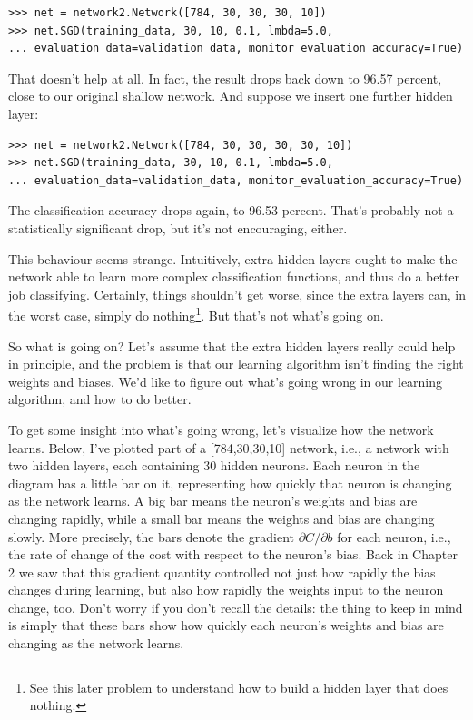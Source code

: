 \documentclass[a4paper,twoside,10pt]{book}
\begin{document}
\begin{lstlisting}
>>> net = network2.Network([784, 30, 30, 30, 10])
>>> net.SGD(training_data, 30, 10, 0.1, lmbda=5.0, 
... evaluation_data=validation_data, monitor_evaluation_accuracy=True)
\end{lstlisting}
That doesn't help at all. In fact, the result drops back down to 96.57 percent, close to our original shallow network. And suppose we insert one further hidden layer:

\begin{lstlisting}
>>> net = network2.Network([784, 30, 30, 30, 30, 10])
>>> net.SGD(training_data, 30, 10, 0.1, lmbda=5.0, 
... evaluation_data=validation_data, monitor_evaluation_accuracy=True)
\end{lstlisting}
The classification accuracy drops again, to 96.53 percent. That's probably not a statistically significant drop, but it's not encouraging, either.

This behaviour seems strange. Intuitively, extra hidden layers ought to make the network able to learn more complex classification functions, and thus do a better job classifying. Certainly, things shouldn't get worse, since the extra layers can, in the worst case, simply do nothing\footnote{See this later problem to understand how to build a hidden layer that does nothing.}. But that's not what's going on.

So what is going on? Let's assume that the extra hidden layers really could help in principle, and the problem is that our learning algorithm isn't finding the right weights and biases. We'd like to figure out what's going wrong in our learning algorithm, and how to do better.

To get some insight into what's going wrong, let's visualize how the network learns. Below, I've plotted part of a [784,30,30,10] network, i.e., a network with two hidden layers, each containing 30 hidden neurons. Each neuron in the diagram has a little bar on it, representing how quickly that neuron is changing as the network learns. A big bar means the neuron's weights and bias are changing rapidly, while a small bar means the weights and bias are changing slowly. More precisely, the bars denote the gradient $\partial C/\partial b$ for each neuron, i.e., the rate of change of the cost with respect to the neuron's bias. Back in Chapter 2 we saw that this gradient quantity controlled not just how rapidly the bias changes during learning, but also how rapidly the weights input to the neuron change, too. Don't worry if you don't recall the details: the thing to keep in mind is simply that these bars show how quickly each neuron's weights and bias are changing as the network learns.
\end{document}

